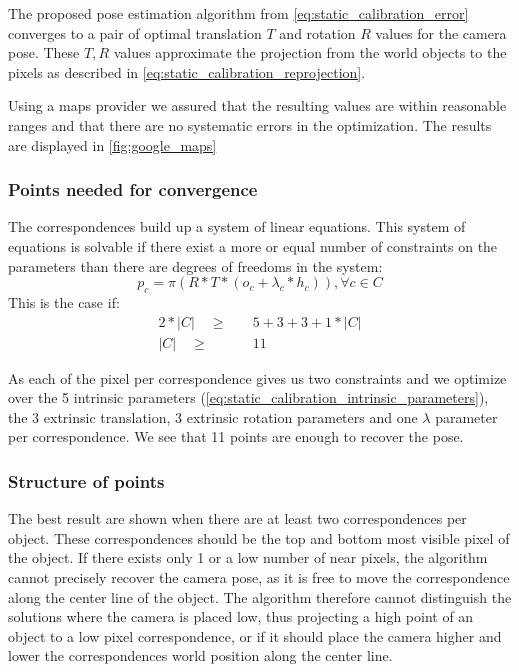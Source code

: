 The proposed pose estimation algorithm from \autoref{eq:static_calibration_error} converges to a pair of optimal translation $T$ and rotation $R$ values for the camera pose.
These $T, R$ values approximate the projection from the world objects to the pixels as described in \autoref{eq:static_calibration_reprojection}.

Using a maps provider we assured that the resulting values are within reasonable ranges and that there are no systematic errors in the optimization.
The results are displayed in \autoref{fig:google_maps}

\subsubsection{Points needed for convergence}
\label{sec:static_calibration_number_points}
The correspondences build up a system of linear equations. 
This system of equations is solvable if there exist a more or equal number of constraints on the parameters than there are degrees of freedoms in the system:
\begin{equation}
  \label{eq:static_calibration_reprojection_evaluation}
  p_c = \pi \left(  
    R * T *
    (o_c + \lambda_c * h_c)
  \right), \forall c \in C
\end{equation}
This is the case if:
\begin{equation}
  \begin{split}
  2 * \left\lvert C \right\rvert \quad \geq& \quad 5 + 3 + 3 + 1 * \left\lvert C \right\rvert \\
  \left\lvert C \right\rvert \quad \geq& \quad 11 
\end{split}
\end{equation} 

As each of the pixel per correspondence gives us two constraints and we optimize over the 5 intrinsic parameters (\autoref{eq:static_calibration_intrinsic_parameters}), the 3 extrinsic translation, 3 extrinsic rotation parameters and one $\lambda$ parameter per correspondence.
We see that 11 points are enough to recover the pose.

\subsubsection{Structure of points}
The best result are shown when there are at least two correspondences per object.
These correspondences should be the top and bottom most visible pixel of the object.
If there exists only 1 or a low number of near pixels, the algorithm cannot precisely recover the camera pose, as it is free to move the correspondence along the center line of the object.
The algorithm therefore cannot distinguish the solutions where the camera is placed low, thus projecting a high point of an object to a low pixel correspondence, 
or if it should place the camera higher and lower the correspondences world position along the center line.

